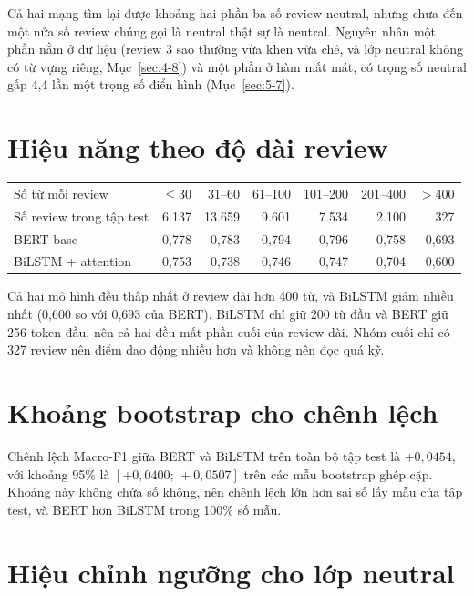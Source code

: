Cả hai mạng tìm lại được khoảng hai phần ba số review neutral, nhưng chưa đến một nửa số review chúng gọi là neutral thật sự là neutral. Nguyên nhân một phần nằm ở dữ liệu (review 3 sao thường vừa khen vừa chê, và lớp neutral không có từ vựng riêng, Mục~\ref{sec:4-8}) và một phần ở hàm mất mát, có trọng số neutral gấp 4,4 lần một trọng số điển hình (Mục~\ref{sec:5-7}).

\section{Hiệu năng theo độ dài review}
\label{sec:7-5}

\begin{center}
\small
\begin{tabular}{@{}lrrrrrr@{}}
    \toprule
    Số từ mỗi review & $\le$30 & 31--60 & 61--100 & 101--200 & 201--400 & $>$400 \\
    Số review trong tập test & 6.137 & 13.659 & 9.601 & 7.534 & 2.100 & 327 \\
    \midrule
    BERT-base & 0,778 & 0,783 & 0,794 & 0,796 & 0,758 & 0,693 \\
    BiLSTM + attention & 0,753 & 0,738 & 0,746 & 0,747 & 0,704 & 0,600 \\
    \bottomrule
\end{tabular}
\end{center}

Cả hai mô hình đều thấp nhất ở review dài hơn 400 từ, và BiLSTM giảm nhiều nhất (0,600 so với 0,693 của BERT). BiLSTM chỉ giữ 200 từ đầu và BERT giữ 256 token đầu, nên cả hai đều mất phần cuối của review dài. Nhóm cuối chỉ có 327 review nên điểm dao động nhiều hơn và không nên đọc quá kỹ.

\section{Khoảng bootstrap cho chênh lệch}
\label{sec:7-6}

Chênh lệch Macro-F1 giữa BERT và BiLSTM trên toàn bộ tập test là $+0{,}0454$, với khoảng 95\% là $[+0{,}0400;\,+0{,}0507]$ trên các mẫu bootstrap ghép cặp. Khoảng này không chứa số không, nên chênh lệch lớn hơn sai số lấy mẫu của tập test, và BERT hơn BiLSTM trong 100\% số mẫu.

\section{Hiệu chỉnh ngưỡng cho lớp neutral}
\label{sec:7-7}

